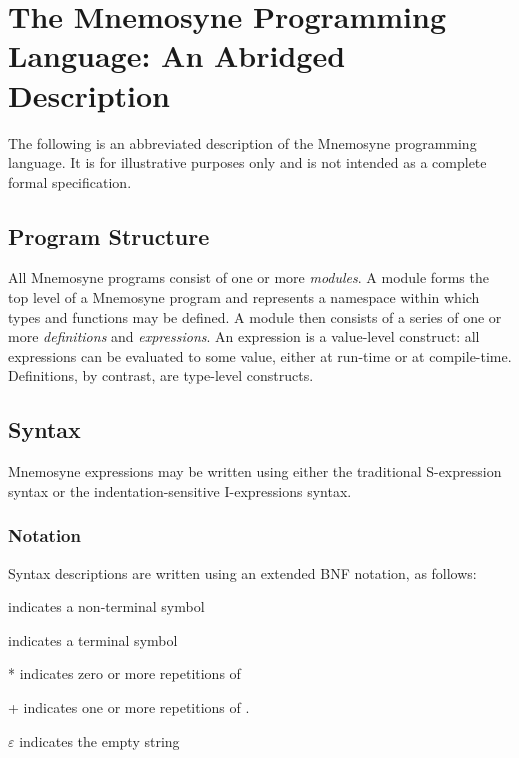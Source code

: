 %

\chapter{The Mnemosyne Programming Language: An Abridged Description}\label{app:spec}

The following is an abbreviated description of the Mnemosyne programming language. It is for illustrative purposes only and is not intended as a complete formal specification.

\section{Program Structure}

All Mnemosyne programs consist of one or more \textit{modules}. A module forms the top level of a Mnemosyne program and represents a namespace within which types and functions may be defined. A module then consists of a series of one or more \textit{definitions} and \textit{expressions}. An expression is a value-level construct: all expressions can be evaluated to some value, either at run-time or at compile-time. Definitions, by contrast, are type-level constructs.

\section{Syntax}

Mnemosyne expressions may be written using either the traditional S-expression syntax or the indentation-sensitive I-expressions syntax.

\subsection{Notation}
Syntax descriptions are written using an extended BNF notation, as follows:
\begin{description}
    \item{} indicates a non-terminal symbol
    \item{} indicates a terminal symbol
    \item{* } indicates zero or more repetitions of 
    \item{+} indicates one or more repetitions of .
    \item{$\varepsilon$} indicates the empty string
\end{description}

